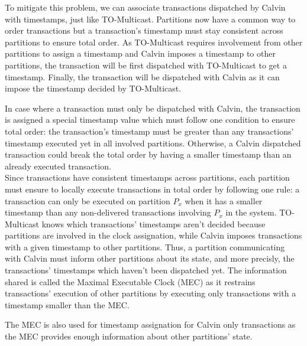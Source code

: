 \documentclass[a4paper, 10pt]{article}
\newcommand{\GE}{TO-Multicast}
\newcommand{\PE}{Calvin}
\begin{document}
   To mitigate this problem, we can associate transactions dispatched by \PE{} with
   timestamps, just like \GE{}. Partitions now have a common way to order transactions but
   a transaction's timestamp must stay consistent across partitions to ensure total order.
   As \GE{} requires involvement from other partitions to assign a timestamp and \PE{}
   imposes a timestamp to other partitions, the transaction will be first dispatched
   with \GE{} to get a timestamp. Finally, the transaction will be dispatched with \PE{}
   as it can impose the timestamp decided by \GE{}.

   In case where a transaction must only be dispatched with \PE{}, the transaction is
   assigned a special timestamp value which must follow one condition to ensure
   total order: the transaction's timestamp must be greater than any transactions' timestamp executed yet
   in all involved partitions.
   Otherwise, a \PE{} dispatched transaction could
   break the total order by having a smaller timestamp than an already executed
   transaction. \\

   Since transactions have consistent timestamps across partitions, each partition
   must ensure to locally execute transactions in total order by following one rule:
   a transaction can only be executed on partition $P_x$ when it has a smaller timestamp
   than any non-delivered transactions involving $P_x$ in the system.
   \GE{} knows which transactions' timestamps aren't decided because partitions are involved in
   the clock assignation, while \PE{} imposes transactions with a given timestamp
   to other partitions. Thus, a partition communicating with \PE{} must inform
   other partitions about its state, and more precisly, the transactions' timestamps which haven't
   been dispatched yet.
   The information shared is called the Maximal Executable Clock (MEC) as
   it restrains transactions' execution of other partitions by executing only transactions with a timestamp
   smaller than the MEC.

   The MEC is also used for timestamp assignation for Calvin only transactions as the MEC provides
   enough information about other partitions' state.
\end{document}
